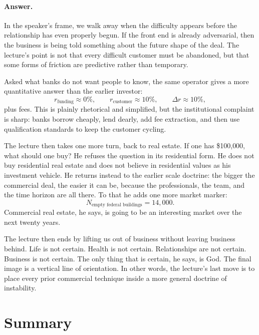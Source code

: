 \paragraph{Answer.} In the speaker's frame, we walk away when the difficulty appears before the relationship has even properly begun. If the front end is already adversarial, then the business is being told something about the future shape of the deal. The lecture's point is not that every difficult customer must be abandoned, but that some forms of friction are predictive rather than temporary.

Asked what banks do not want people to know, the same operator gives a more quantitative answer than the earlier investor:
\begin{equation}
r_{\text{funding}} \approx 0\%,\qquad
r_{\text{customer}} \approx 10\%,\qquad
\Delta r \approx 10\%,
\end{equation}
plus fees. This is plainly rhetorical and simplified, but the institutional complaint is sharp: banks borrow cheaply, lend dearly, add fee extraction, and then use qualification standards to keep the customer cycling.

The lecture then takes one more turn, back to real estate. If one has \$100{,}000, what should one buy? He refuses the question in its residential form. He does not buy residential real estate and does not believe in residential values as his investment vehicle. He returns instead to the earlier scale doctrine: the bigger the commercial deal, the easier it can be, because the professionals, the team, and the time horizon are all there. To that he adds one more market marker:
\begin{equation}
N_{\text{empty federal buildings}} = 14{,}000.
\end{equation}
Commercial real estate, he says, is going to be an interesting market over the next twenty years.

The lecture then ends by lifting us out of business without leaving business behind. Life is not certain. Health is not certain. Relationships are not certain. Business is not certain. The only thing that is certain, he says, is God. The final image is a vertical line of orientation. In other words, the lecture's last move is to place every prior commercial technique inside a more general doctrine of instability.

\section{Summary}


